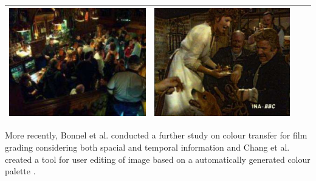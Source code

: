 \begin{longtable}{|N||c|c|c|}
\begin{minipage}{.29\textwidth}
    \includegraphics[width=\textwidth,height=\textheight,keepaspectratio]{images/pitie_target2}
  \end{minipage} & 
  \begin{minipage}{.29\textwidth}
    \includegraphics[width=\textwidth,height=\textheight,keepaspectratio]{images/pitie_result2}
  \end{minipage} \\
    \hline
\end{longtable}

More recently, Bonnel et al. conducted a further study on colour transfer for film grading considering both spacial and temporal information \cite{bonneel_2013_video} and Chang et al. created a tool for user editing of image based on a automatically generated colour palette \cite{chang_2015_palette}.

